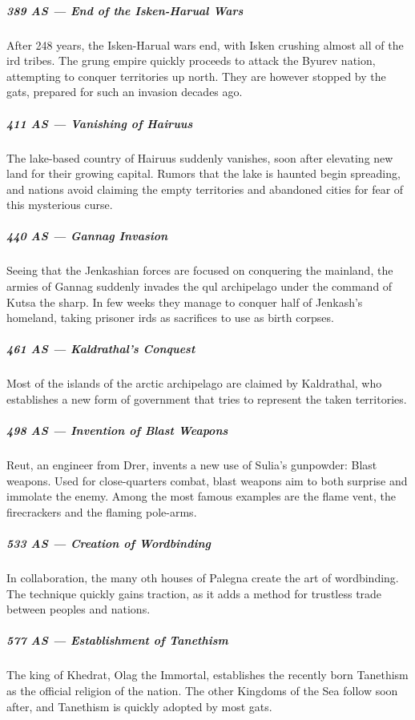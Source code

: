 \subparagraph{389 AS --- End of the Isken-Harual Wars} After 248 years, the Isken-Harual wars end, with Isken crushing almost all of the ird tribes.
The grung empire quickly proceeds to attack the Byurev nation, attempting to conquer territories up north.
They are however stopped by the gats, prepared for such an invasion decades ago.

\subparagraph{411 AS --- Vanishing of Hairuus} The lake-based country of Hairuus suddenly vanishes, soon after elevating new land for their growing capital.
Rumors that the lake is haunted begin spreading, and nations avoid claiming the empty territories and abandoned cities for fear of this mysterious curse.

\subparagraph{440 AS --- Gannag Invasion} Seeing that the Jenkashian forces are focused on conquering the mainland, the armies of Gannag suddenly invades the qul archipelago under the command of Kutsa the sharp.
In few weeks they manage to conquer half of Jenkash's homeland, taking prisoner irds as sacrifices to use as birth corpses.

\subparagraph{461 AS --- Kaldrathal's Conquest} Most of the islands of the arctic archipelago are claimed by Kaldrathal, who establishes a new form of government that tries to represent the taken territories.

\subparagraph{498 AS --- Invention of Blast Weapons} Reut, an engineer from Drer, invents a new use of Sulia's gunpowder: Blast weapons.
Used for close-quarters combat, blast weapons aim to both surprise and immolate the enemy.
Among the most famous examples are the flame vent, the firecrackers and the flaming pole-arms.

\subparagraph{533 AS --- Creation of Wordbinding} In collaboration, the many oth houses of Palegna create the art of wordbinding.
The technique quickly gains traction, as it adds a method for trustless trade between peoples and nations.


\subparagraph{577 AS --- Establishment of Tanethism} The king of Khedrat, Olag the Immortal, establishes the recently born Tanethism as the official religion of the nation.
The other Kingdoms of the Sea follow soon after, and Tanethism is quickly adopted by most gats.

